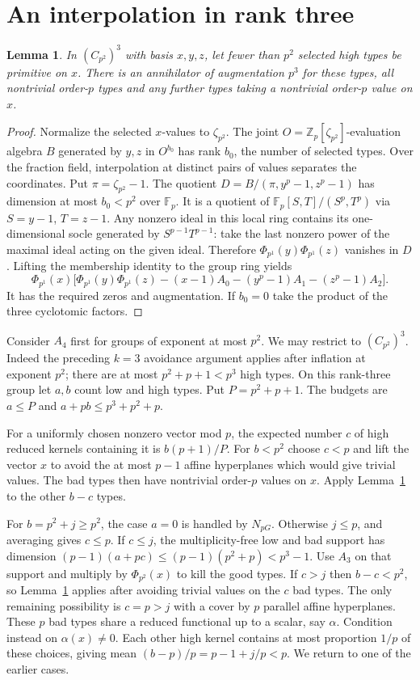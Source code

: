 \documentclass[11pt]{article}
\newtheorem{lemma}[theorem]{Lemma}
\newcommand{\Z}{\mathbb Z}
\newcommand{\F}{\mathbb F}
\newcommand{\Ph}[1]{\Phi_{p^{#1}}}
\begin{document}
\section{An interpolation in rank three}
\begin{lemma}\label{lem:interp}
In $(C_{p^2})^3$ with basis $x,y,z$, let fewer than $p^2$ selected high
types be primitive on $x$. There is an annihilator of augmentation $p^3$
for these types, all nontrivial order-$p$ types and any further types
taking a nontrivial order-$p$ value on $x$.
\end{lemma}
\begin{proof}
Normalize the selected $x$-values to $\zeta_{p^2}$. The joint
$O=\Z_p[\zeta_{p^2}]$-evaluation algebra $B$ generated by $y,z$ in
$O^{b_0}$ has rank $b_0$, the number of selected types. Over the
fraction field, interpolation at distinct pairs of values separates the
coordinates. Put $\pi=\zeta_{p^2}-1$. The quotient
$D=B/(\pi,y^p-1,z^p-1)$ has dimension at most $b_0<p^2$ over $\F_p$.
It is a quotient of $\F_p[S,T]/(S^p,T^p)$ via $S=y-1$, $T=z-1$.
Any nonzero ideal in this local ring contains its one-dimensional socle
generated by $S^{p-1}T^{p-1}$: take the last nonzero power of the maximal
ideal acting on the given ideal. Therefore $\Ph{1}(y)\Ph{1}(z)$ vanishes
in $D$. Lifting the membership identity to the group ring yields
\[
 \Ph{1}(x)\big[\Ph{1}(y)\Ph{1}(z)
 -(x-1)A_0-(y^p-1)A_1-(z^p-1)A_2\big].
\]
It has the required zeros and augmentation. If $b_0=0$ take the product
of the three cyclotomic factors.
\end{proof}

Consider $A_4$ first for groups of exponent at most $p^2$. We may
restrict to $(C_{p^2})^3$. Indeed the preceding $k=3$ avoidance
argument applies after inflation at exponent $p^2$; there are at most
$p^2+p+1<p^3$ high types. On this rank-three group let $a,b$ count
low and high types. Put $P=p^2+p+1$. The budgets are
$a\le P$ and $a+pb\le p^3+p^2+p$.

For a uniformly chosen nonzero vector mod $p$, the expected number $c$
of high reduced kernels containing it is $b(p+1)/P$. For $b<p^2$
choose $c<p$ and lift the vector $x$ to avoid the at most $p-1$ affine
hyperplanes which would give trivial values. The bad types then have
nontrivial order-$p$ values on $x$. Apply Lemma~\ref{lem:interp} to
the other $b-c$ types.

For $b=p^2+j\ge p^2$, the case $a=0$ is handled by $N_{pG}$.
Otherwise $j\le p$, and averaging gives $c\le p$.
If $c\le j$, the multiplicity-free low and bad support has dimension
$(p-1)(a+pc)\le(p-1)(p^2+p)<p^3-1$. Use $A_3$ on that support and
multiply by $\Ph{2}(x)$ to kill the good types. If $c>j$ then
$b-c<p^2$, so Lemma~\ref{lem:interp} applies after avoiding trivial
values on the $c$ bad types. The only remaining possibility is
$c=p>j$ with a cover by $p$ parallel affine hyperplanes. These $p$
bad types share a reduced functional up to a scalar, say $\alpha$.
Condition instead on $\alpha(x)\ne0$. Each other high kernel contains
at most proportion $1/p$ of these choices, giving mean
$(b-p)/p=p-1+j/p<p$. We return to one of the earlier cases.
\end{document}

